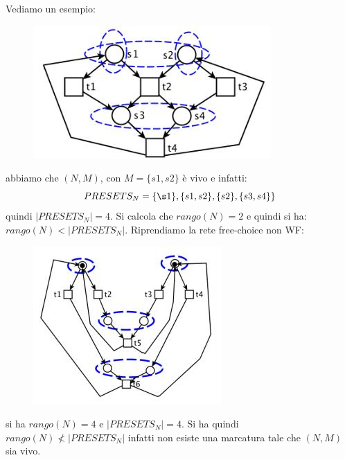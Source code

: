 \documentclass[a4paper,12pt, oneside]{book}
\begin{document}
\begin{esempio}
  Vediamo un esempio:
  \begin{figure}[H]
    \centering
    \includegraphics[scale = 0.65]{img/cc7.jpg}
  \end{figure}
  abbiamo che $(N, M)$, con $M = \{s1 , s2 \}$ è vivo e infatti:
  \[PRESETS_N = \{\s 1 \}, \{s 1 , s 2 \}, \{s 2 \}, \{s 3 , s 4 \}\}\]
  quindi $|PRESETS_N|=4$. Si calcola che $rango(N)=2$ e quindi si ha:
  $rango(N)<|PRESETS_N|$.
  \newpage
  Riprendiamo la rete free-choice non WF:
  \begin{figure}[H]
    \centering
    \includegraphics[scale = 0.65]{img/cc8.jpg}
  \end{figure}
  si ha $rango(N)=4$ e $|PRESETS_N|=4$. Si ha quindi $rango(N)\not<|PRESETS_N|$
  infatti non esiste una marcatura tale che $(N, M)$ sia vivo.
\end{esempio}
\end{document}
